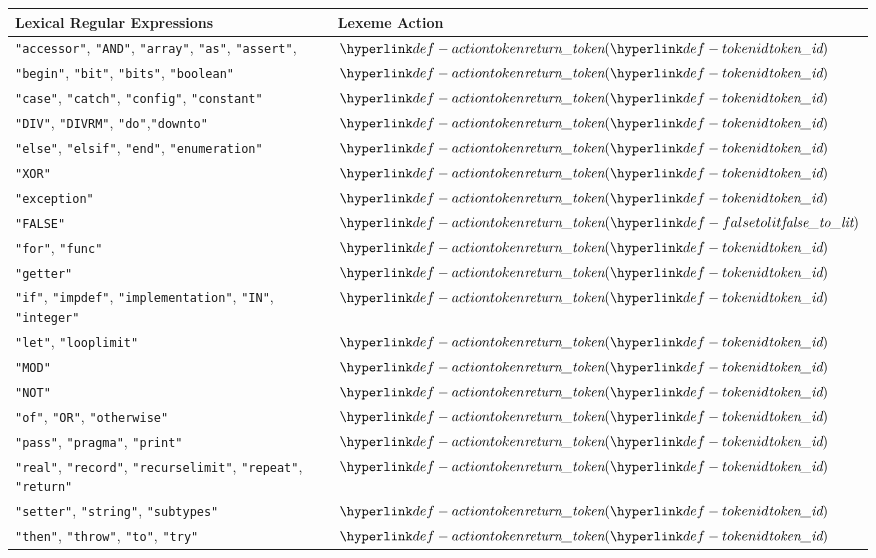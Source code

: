 \begin{center}
\begin{tabular}{ll}
\textbf{Lexical Regular Expressions} & \textbf{Lexeme Action}\\
\hline
\texttt{"accessor"}, \texttt{"AND"}, \texttt{"array"}, \texttt{"as"}, \texttt{"assert"},      & $\actiontoken(\tokenid)$ \\
\texttt{"begin"}, \texttt{"bit"}, \texttt{"bits"}, \texttt{"boolean"}       & $\actiontoken(\tokenid)$ \\
\texttt{"case"}, \texttt{"catch"}, \texttt{"config"}, \texttt{"constant"}      & $\actiontoken(\tokenid)$ \\
\texttt{"DIV"}, \texttt{"DIVRM"}, \texttt{"do"},\texttt{"downto"}        & $\actiontoken(\tokenid)$ \\
\texttt{"else"}, \texttt{"elsif"}, \texttt{"end"}, \texttt{"enumeration"}   & $\actiontoken(\tokenid)$ \\
\texttt{"XOR"}           & $\actiontoken(\tokenid)$ \\
\texttt{"exception"}     & $\actiontoken(\tokenid)$ \\
\texttt{"FALSE"} & $\actiontoken(\falsetolit)$  \\
\texttt{"for"}, \texttt{"func"}          & $\actiontoken(\tokenid)$ \\
\texttt{"getter"}        & $\actiontoken(\tokenid)$ \\
\texttt{"if"}, \texttt{"impdef"}, \texttt{"implementation"}, \texttt{"IN"}, \texttt{"integer"}       & $\actiontoken(\tokenid)$ \\
\texttt{"let"}, \texttt{"looplimit"}           & $\actiontoken(\tokenid)$ \\
\texttt{"MOD"}           & $\actiontoken(\tokenid)$ \\
\texttt{"NOT"}           & $\actiontoken(\tokenid)$ \\
\texttt{"of"},      \texttt{"OR"},      \texttt{"otherwise"}                  & $\actiontoken(\tokenid)$ \\
\texttt{"pass"},    \texttt{"pragma"},  \texttt{"print"}                      & $\actiontoken(\tokenid)$ \\
\texttt{"real"},    \texttt{"record"},  \texttt{"recurselimit"}, \texttt{"repeat"}, \texttt{"return"}  & $\actiontoken(\tokenid)$ \\
\texttt{"setter"},  \texttt{"string"},  \texttt{"subtypes"}                   & $\actiontoken(\tokenid)$ \\
\texttt{"then"},    \texttt{"throw"},   \texttt{"to"}, \texttt{"try"}         & $\actiontoken(\tokenid)$ \\

\end{tabular}
\end{center}
